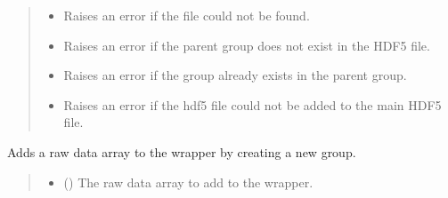 \documentclass[letterpaper,10pt,english]{sphinxmanual}
\begin{document}
\begin{fulllineitems}
\begin{fulllineitems}
\begin{quote}
\begin{description}
\begin{itemize}
\end{itemize}

\begin{itemize}
\item {} 
\sphinxAtStartPar
{\hyperref[\detokenize{source/HDF5_BLS:HDF5_BLS.WrapperError.WrapperError_FileNotFound}]{}} \textendash{} Raises an error if the file could not be found.

\item {} 
\sphinxAtStartPar
{\hyperref[\detokenize{source/HDF5_BLS:HDF5_BLS.WrapperError.WrapperError_StructureError}]{}} \textendash{} Raises an error if the parent group does not exist in the HDF5 file.

\item {} 
\sphinxAtStartPar
{\hyperref[\detokenize{source/HDF5_BLS:HDF5_BLS.WrapperError.WrapperError_Overwrite}]{}} \textendash{} Raises an error if the group already exists in the parent group.

\item {} 
\sphinxAtStartPar
{\hyperref[\detokenize{source/HDF5_BLS:HDF5_BLS.WrapperError.WrapperError}]{}} \textendash{} Raises an error if the hdf5 file could not be added to the main HDF5 file.

\end{itemize}

\end{description}\end{quote}

\end{fulllineitems}


\begin{fulllineitems}
\label{\detokenize{source/HDF5_BLS:HDF5_BLS.wrapper.Wrapper.add_raw_data}}
\pysigstartsignatures
\pysiglinewithargsret
{}
{\sphinxparamcomma {}\sphinxparamcomma {}\sphinxparamcomma {}}
{}
\pysigstopsignatures
\sphinxAtStartPar
Adds a raw data array to the wrapper by creating a new group.
\begin{quote}\begin{description}
\begin{itemize}
\item {} 
\sphinxAtStartPar
{} () \textendash{} The raw data array to add to the wrapper.


\end{itemize}
\end{description}
\end{quote}
\end{fulllineitems}
\end{fulllineitems}
\end{document}
